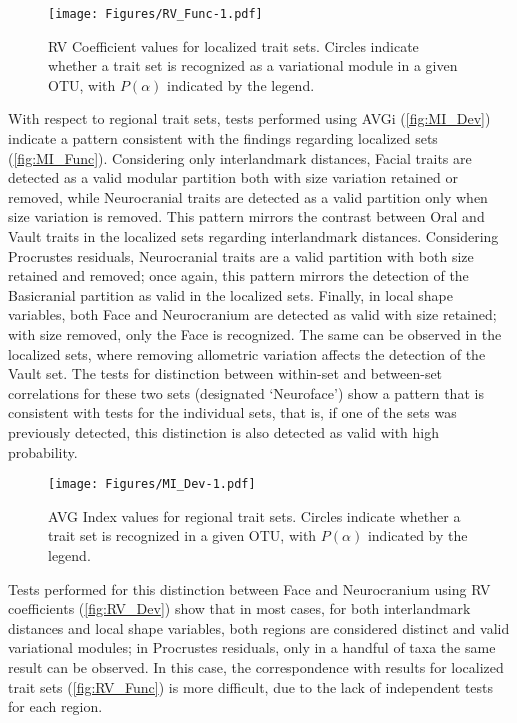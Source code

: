 \documentclass[12pt,]{article}
\begin{document}
\begin{figure}[htbp]
\centering
\texttt{[image: Figures/RV\_Func-1.pdf]}
\caption{RV Coefficient values for localized trait sets. Circles
indicate whether a trait set is recognized as a variational module in a
given OTU, with $P(\alpha)$ indicated by the legend.
\label{fig:RV_Func}}
\end{figure}

With respect to regional trait sets, tests performed using AVGi
(\autoref{fig:MI_Dev}) indicate a pattern consistent with the findings
regarding localized sets (\autoref{fig:MI_Func}). Considering only
interlandmark distances, Facial traits are detected as a valid modular
partition both with size variation retained or removed, while
Neurocranial traits are detected as a valid partition only when size
variation is removed. This pattern mirrors the contrast between Oral and
Vault traits in the localized sets regarding interlandmark distances.
Considering Procrustes residuals, Neurocranial traits are a valid
partition with both size retained and removed; once again, this pattern
mirrors the detection of the Basicranial partition as valid in the
localized sets. Finally, in local shape variables, both Face and
Neurocranium are detected as valid with size retained; with size
removed, only the Face is recognized. The same can be observed in the
localized sets, where removing allometric variation affects the
detection of the Vault set. The tests for distinction between within-set
and between-set correlations for these two sets (designated `Neuroface')
show a pattern that is consistent with tests for the individual sets,
that is, if one of the sets was previously detected, this distinction is
also detected as valid with high probability.

\begin{figure}[htbp]
\centering
\texttt{[image: Figures/MI\_Dev-1.pdf]}
\caption{AVG Index values for regional trait sets. Circles indicate
whether a trait set is recognized in a given OTU, with $P(\alpha)$
indicated by the legend. \label{fig:MI_Dev}}
\end{figure}

Tests performed for this distinction between Face and Neurocranium using
RV coefficients (\autoref{fig:RV_Dev}) show that in most cases, for both
interlandmark distances and local shape variables, both regions are
considered distinct and valid variational modules; in Procrustes
residuals, only in a handful of taxa the same result can be observed. In
this case, the correspondence with results for localized trait sets
(\autoref{fig:RV_Func}) is more difficult, due to the lack of
independent tests for each region.
\end{document}
